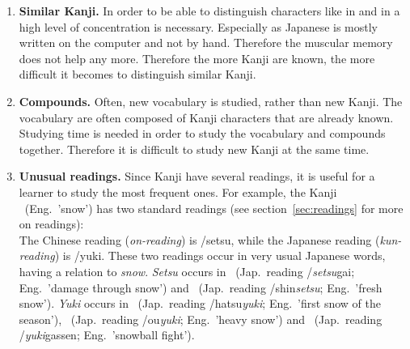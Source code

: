 \begin{enumerate}
  \item \textbf{Similar Kanji.} In order to be able to distinguish characters 
        like  in  and  in  a high level of
        concentration is necessary. Especially as Japanese is mostly written
        on the computer and not by hand. Therefore the muscular memory 
        does not help any more. Therefore the more Kanji are known, the more 
        difficult it becomes to distinguish similar Kanji.

  \item \textbf{Compounds.} Often, new vocabulary is studied, rather than new 
        Kanji. The vocabulary are often composed of Kanji characters that are 
        already known. Studying time is needed in order to study the vocabulary 
        and compounds together. Therefore it is difficult to study new Kanji 
        at the same time.

  \item \textbf{Unusual readings.} Since Kanji have several readings, 
        it is useful for a learner to study the most frequent ones.
        For example, the Kanji ~(Eng.~'snow') has two 
        standard readings (see section~\ref{sec:readings} for more on 
        readings):\\
        The Chinese reading (\emph{on-reading}) is /setsu, 
        while the Japanese reading (\emph{kun-reading}) is /yuki.
        These two readings occur in very usual Japanese words, having a 
        relation to \emph{snow}. \emph{Setsu} occurs in
        ~(Jap.~reading /\emph{setsu}gai; 
        Eng.~'damage through snow') and
        ~(Jap.~reading /shin\emph{setsu}; 
        Eng.~'fresh snow').
        \emph{Yuki} occurs in
        ~(Jap.~reading /hatsu\emph{yuki}; 
        Eng.~'first snow of the season'),
        ~(Jap.~reading /ou\emph{yuki}; 
        Eng.~'heavy snow') and
        ~(Jap.~reading /\emph{yuki}gassen; 
        Eng.~'snowball fight'). 


\end{enumerate}
